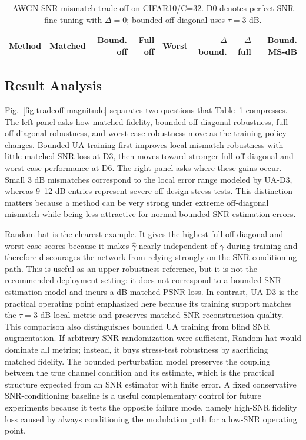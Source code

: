 \documentclass[10pt,journal]{IEEEtran}
\begin{document}
\begin{table}[t]
\caption{AWGN SNR-mismatch trade-off on CIFAR10/C=32. D0 denotes perfect-SNR fine-tuning with $\Delta=0$; bounded off-diagonal uses $\tau=3$ dB.}
\label{tab:tradeoff}
\centering
\scriptsize
\begin{tabular}{lrrrrrrr}
\toprule
Method & Matched & Bound. off & Full off & Worst & $\Delta$ bound. & $\Delta$ full & Bound. MS-dB\\
\midrule

\bottomrule
\end{tabular}
\end{table}



\subsection{Result Analysis}

Fig.~\ref{fig:tradeoff-magnitude} separates two questions that Table~\ref{tab:tradeoff} compresses. The left panel asks how matched fidelity, bounded off-diagonal robustness, full off-diagonal robustness, and worst-case robustness move as the training policy changes. Bounded UA training first improves local mismatch robustness with little matched-SNR loss at D3, then moves toward stronger full off-diagonal and worst-case performance at D6. The right panel asks where these gains occur. Small 3 dB mismatches correspond to the local error range modeled by UA-D3, whereas 9--12 dB entries represent severe off-design stress tests. This distinction matters because a method can be very strong under extreme off-diagonal mismatch while being less attractive for normal bounded SNR-estimation errors.

Random-hat is the clearest example. It gives the highest full off-diagonal and worst-case scores because it makes $\hat{\gamma}$ nearly independent of $\gamma$ during training and therefore discourages the network from relying strongly on the SNR-conditioning path. This is useful as an upper-robustness reference, but it is not the recommended deployment setting: it does not correspond to a bounded SNR-estimation model and incurs a \RandomDiagGain{} dB matched-PSNR loss. In contrast, UA-D3 is the practical operating point emphasized here because its training support matches the $\tau=3$ dB local metric and preserves matched-SNR reconstruction quality.
This comparison also distinguishes bounded UA training from blind SNR augmentation. If arbitrary SNR randomization were sufficient, Random-hat would dominate all metrics; instead, it buys stress-test robustness by sacrificing matched fidelity. The bounded perturbation model preserves the coupling between the true channel condition and its estimate, which is the practical structure expected from an SNR estimator with finite error. A fixed conservative SNR-conditioning baseline is a useful complementary control for future experiments because it tests the opposite failure mode, namely high-SNR fidelity loss caused by always conditioning the modulation path for a low-SNR operating point.
\end{document}
